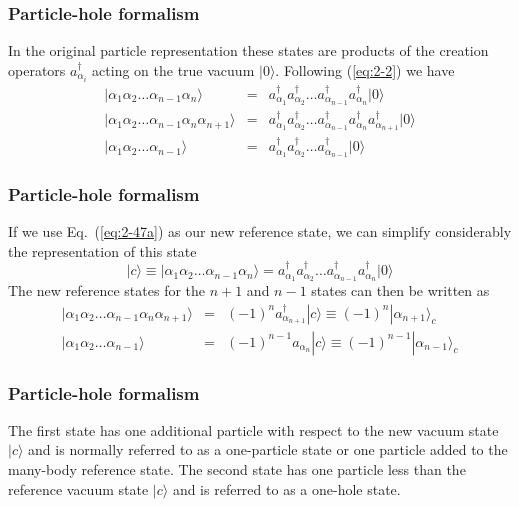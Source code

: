 \documentclass[compress]{beamer}
\newcommand*{\ket}[1]{|#1\rangle}
\begin{document}
\frame
{
  \frametitle{Particle-hole formalism}
\begin{small}
{\scriptsize
In the original particle representation these states are products of the creation operators  
$a_{\alpha_i}^\dagger$ acting on the true vacuum $\ket{0}$.
Following (\ref{eq:2-2}) we have 
\begin{eqnarray}
	\ket{\alpha_1\alpha_2\dots\alpha_{n-1}\alpha_n} &=& a_{\alpha_1}^\dagger a_{\alpha_2}^\dagger \dots
					a_{\alpha_{n-1}}^\dagger a_{\alpha_n}^\dagger \ket{0} \label{eq:2-47a} \\
	\ket{\alpha_1\alpha_2\dots\alpha_{n-1}\alpha_n\alpha_{n+1}} &=&
		a_{\alpha_1}^\dagger a_{\alpha_2}^\dagger \dots a_{\alpha_{n-1}}^\dagger a_{\alpha_n}^\dagger
		a_{\alpha_{n+1}}^\dagger \ket{0} \label{eq:2-47b} \\
	\ket{\alpha_1\alpha_2\dots\alpha_{n-1}} &=& a_{\alpha_1}^\dagger a_{\alpha_2}^\dagger \dots
		a_{\alpha_{n-1}}^\dagger \ket{0} \label{eq:2-47c}
\end{eqnarray}
}
\end{small}
}

\frame
{
  \frametitle{Particle-hole formalism}
\begin{small}
{\scriptsize
If we use Eq.~(\ref{eq:2-47a}) as our new reference state, we can simplify considerably the representation of 
this state
\begin{equation}
	\ket{c} \equiv \ket{\alpha_1\alpha_2\dots\alpha_{n-1}\alpha_n} =
		a_{\alpha_1}^\dagger a_{\alpha_2}^\dagger \dots a_{\alpha_{n-1}}^\dagger a_{\alpha_n}^\dagger \ket{0} \label{eq:2-48a}
\end{equation}
The new reference states for the $n+1$ and $n-1$ states can then be written as
\begin{eqnarray}
	\ket{\alpha_1\alpha_2\dots\alpha_{n-1}\alpha_n\alpha_{n+1}} &=& (-1)^n a_{\alpha_{n+1}}^\dagger \ket{c}
		\equiv (-1)^n \ket{\alpha_{n+1}}_c \label{eq:2-48b} \\
	\ket{\alpha_1\alpha_2\dots\alpha_{n-1}} &=& (-1)^{n-1} a_{\alpha_n} \ket{c} 
		\equiv (-1)^{n-1} \ket{\alpha_{n-1}}_c \label{eq:2-48c} 
\end{eqnarray}
}
\end{small}
}

\frame
{
  \frametitle{Particle-hole formalism}
\begin{small}
{\scriptsize
The first state has one additional particle with respect to the new vacuum state
$\ket{c}$  and is normally referred to as a one-particle state or one particle added to the 
many-body reference state. 
The second state has one particle less than the reference vacuum state  $\ket{c}$ and is referred to as
a one-hole state. 
}
\end{small}
}
\end{document}
